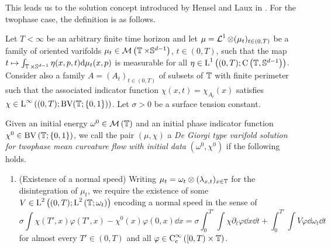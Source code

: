 This leads us to the solution concept introduced by Hensel and Laux in 
\cite{hensel_laux_varifold_solution_concept_for_mean_curvature_flow}.
For the twophase case, the definition is as follows.

\begin{definition}
	Let $ T < \infty $ be an arbitrary finite time horizon and let $ \mu = 
	\operatorname{\mathcal{L}}^{ 1 } \otimes ( \mu_{ t } )_{ t \in ( 0 , T ) } $ be a 
	family of oriented varifolds $ \mu_{ t } \in \mathcal{ M } \left( 
	\operatorname{\mathbb{T}} \times \mathbb{ S }^{ d - 1 } \right) $, $ t \in ( 0 , T ) 
	$, such that the map $ t \mapsto \int_{ \operatorname{\mathbb{T}} \times \mathbb{ S }^{ d 
	-1 } } \eta ( x , p , t ) \dd \mu_{ t } ( x , p ) $ is measurable for all 
	$ \eta \in \operatorname{L}^{ 1 } \left( ( 0 , T ) ; \operatorname{C} \left( \operatorname{\mathbb{T}}, 
	\mathbb{ S 
	}^{ d - 1 } \right) \right) $. 
	Consider also a family $ A = ( A_{ t } )_{ t \in ( 0 , T ) } $ of 
	subsets of $ \operatorname{\mathbb{T}} $ with finite perimeter such that the associated 
	indicator function $ \chi ( x , t ) = \chi_{ A _{ t } } ( x ) $ satisfies 
	$ \chi \in \operatorname{L}^{ \infty } \left( ( 0 , T ) ; \operatorname{BV} ( \operatorname{\mathbb{T}} ; \{ 0 , 
	1 \} ) \right) $.
	Let $ \sigma > 0 $ be a surface tension constant.
	
	Given an initial energy
	$ \omega^{ 0 } \in \mathcal{ M } \left( \operatorname{\mathbb{T}} \right) $ and an initial 
	phase indicator function $ \chi^{ 0 } \in \operatorname{BV} 
	\left( \operatorname{\mathbb{T}} ; \{ 0 , 1 \} \right)$, we call the pair $ ( \mu , \chi ) 
	$ a \emph{De Giorgi type varifold solution for twophase mean curvature flow 
	with initial data} $ ( \omega^{ 0 } , \chi^{ 0 } ) $ if the following holds.
	\begin{enumerate}
		\item (Existence of a normal speed)
		Writing $ \mu_{ t } = \omega_{ t } \otimes ( \lambda_{ x , t } )_{ x 
		\in \operatorname{\mathbb{T}}} $ for the disintegration of $ \mu_{ t } $, we require 
		the existence of some 
		$ V \in \operatorname{L}^{ 2 } \left( ( 0 , T ) ; \operatorname{L}^{ 2 } \left( \operatorname{\mathbb{T}} ; 
		\omega_{ t } \right) \right) $ encoding a normal speed in the sense of
		\begin{equation}
			\label{equation_varifold_velocity}
			\sigma
			\int
				\chi ( T' , x ) \varphi ( T' , x ) 
				-
				\chi^{ 0 } ( x ) \varphi (0,x)
			\dd{ x }
			=
			\sigma
			\int_{ 0 }^{ T' }
				\int
					\chi
					\partial_{ t } \varphi 
				\dd{ x }
			\dd{ t }
			+
			\int_{ 0 }^{ T' }
				\int
					V \varphi 
				\dd{ \omega_{ t } }
			\dd{ t }
		\end{equation}
		for almost every $ T' \in ( 0 , T ) $ and all $ \varphi \in \operatorname{C}_{ 
		\mathrm{c} }^{ \infty } \left( [ 0 , T ) \times \operatorname{\mathbb{T}} \right) 
		$.
		

\end{enumerate}
\end{definition}
